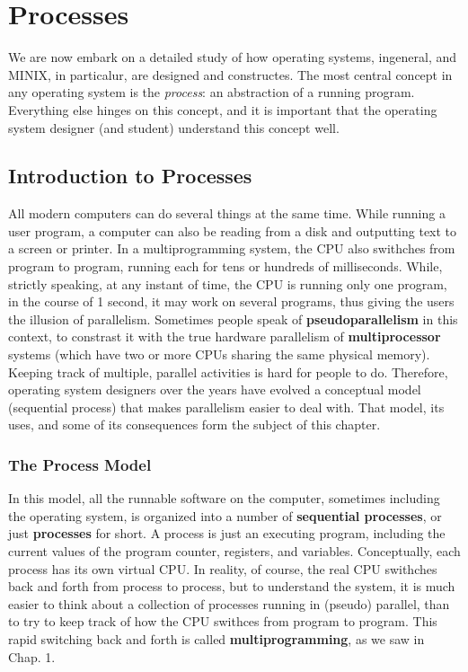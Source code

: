 \documentclass{book}
\newcommand {\kw}  [1] {\textbf{#1}}
\newcommand {\sys} [1] {\textsl{#1}}
\begin{document}
\chapter{Processes}
We are now embark on a detailed study of how operating systems, ingeneral, and MINIX, in particalur, are designed and constructes.
The most central concept in any operating system is the \sys{process}: an abstraction of a running program.
Everything else hinges on this concept, and it is important that the operating system designer (and student) understand this concept well.

\section{Introduction to Processes}
All modern computers can do several things at the same time.
While running a user program, a computer can also be reading from a disk and outputting text to a screen or printer.
In a multiprogramming system, the CPU also swithches from program to program, 
running each for tens or hundreds of milliseconds.
While, strictly speaking, at any instant of time, the CPU is running only one program, 
in the course of 1 second, it may work on several programs, thus giving the users the illusion of parallelism.
Sometimes people speak of \kw{pseudoparallelism} in this context, 
to constrast it with the true hardware parallelism of \kw{multiprocessor} systems (which have two or more CPUs sharing the same physical memory).
Keeping track of multiple, parallel activities is hard for people to do.
Therefore, operating system designers over the years have evolved a conceptual model (sequential process) 
that makes parallelism easier to deal with.
That model, its uses, and some of its consequences form the subject of this chapter.

\subsection{The Process Model}
In this model, all the runnable software on the computer, sometimes including the operating system, 
is organized into a number of \kw{sequential processes}, or just \kw{processes} for short.
A process is just an executing program, including the current values of the program counter, registers, and variables.
Conceptually, each process has its own virtual CPU.
In reality, of course, the real CPU swithches back and forth from process to process,
but to understand the system, it is much easier to think about a collection of processes running in (pseudo) parallel,
than to try to keep track of how the CPU swithces from program to program.
This rapid switching back and forth is called \kw{multiprogramming}, as we saw in Chap. 1.
\end{document}
